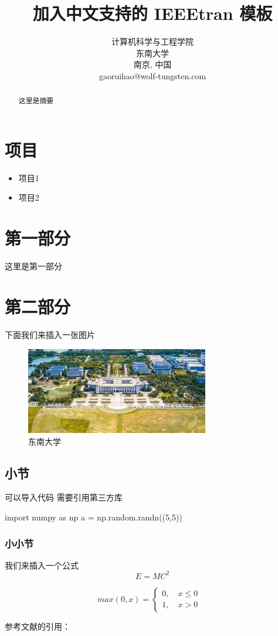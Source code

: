 \documentclass[10pt, conference, compsocconf]{IEEEtran}
\begin{document}
\title{加入中文支持的 IEEEtran 模板}

\author
{
    \IEEEauthorblockA
    {
    计算机科学与工程学院\\
    东南大学\\
    南京, 中国\\
    gaoruihao@wolf-tungsten.com
    }
}

\maketitle

\begin{abstract}
这里是摘要
\end{abstract}


\IEEEpeerreviewmaketitle

\section{项目}
\begin{itemize}
	\item	项目1
	\item	项目2

	
\end{itemize}

\section{第一部分}
这里是第一部分

\section{第二部分}
下面我们来插入一张图片
\begin{figure}[h]
	\includegraphics[width=8cm]{seu.jpg}
	\caption{东南大学} 
	\label{school}
\end{figure}


\subsection{小节}
可以导入代码
需要引用第三方库
\begin{python}
import numpy as np
a = np.random.randn((5,5))
\end{python}


\subsubsection{小小节}
我们来插入一个公式
\begin{equation}
  E= MC^2
\end{equation}


\begin{equation}
max(0,x)=\left\{
\begin{aligned}
0, \quad x \leq 0 & \\
1, \quad x > 0  &
\end{aligned}
\right.
\end{equation}

参考文献的引用：
\cite{yearbook2005china}

 
   
\end{document}
